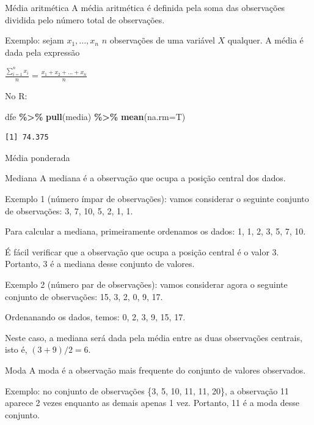 \documentclass[
  9pt,
  ignorenonframetext,
  aspectratio=169]{beamer}
\newenvironment{Shaded}{\begin{snugshade}}{\end{snugshade}}
\newcommand{\DataTypeTok}[1]{\textcolor[rgb]{0.13,0.29,0.53}{#1}}
\newcommand{\KeywordTok}[1]{\textcolor[rgb]{0.13,0.29,0.53}{\textbf{#1}}}
\newcommand{\NormalTok}[1]{#1}
\newcommand{\OperatorTok}[1]{\textcolor[rgb]{0.81,0.36,0.00}{\textbf{#1}}}
\newcommand{\StringTok}[1]{\textcolor[rgb]{0.31,0.60,0.02}{#1}}
\begin{document}
\begin{frame}[fragile]{Média aritmética}
\protect\hypertarget{muxe9dia-aritmuxe9tica}{}
A média aritmética é definida pela soma das observações dividida pelo
número total de observações.

Exemplo: sejam \(x_1, ..., x_n\) \(n\) observações de uma variável \(X\)
qualquer. A média é dada pela expressão

\(\frac{\sum_{i=1}^{n}x_i}{n} = \frac{x_1 + x_2 + ... + x_n}{n}\)

No R:

\begin{Shaded}
\begin{Highlighting}[]
\NormalTok{dfe }\OperatorTok{\%\textgreater{}\%}
\StringTok{  }\KeywordTok{pull}\NormalTok{(media) }\OperatorTok{\%\textgreater{}\%}
\StringTok{  }\KeywordTok{mean}\NormalTok{(}\DataTypeTok{na.rm=}\NormalTok{T)}
\end{Highlighting}
\end{Shaded}

\begin{verbatim}
[1] 74.375
\end{verbatim}
\end{frame}

\begin{frame}{Média ponderada}
\protect\hypertarget{muxe9dia-ponderada}{}
\end{frame}

\begin{frame}{Mediana}
\protect\hypertarget{mediana}{}
A mediana é a observação que ocupa a posição central dos dados.

Exemplo 1 (número ímpar de observações): vamos considerar o seguinte
conjunto de observações: 3, 7, 10, 5, 2, 1, 1.

Para calcular a mediana, primeiramente ordenamos os dados: 1, 1, 2, 3,
5, 7, 10.

É fácil verificar que a observação que ocupa a posição central é o valor
3. Portanto, 3 é a mediana desse conjunto de valores.

Exemplo 2 (número par de observações): vamos considerar agora o seguinte
conjunto de observações: 15, 3, 2, 0, 9, 17.

Ordenanando os dados, temos: 0, 2, 3, 9, 15, 17.

Neste caso, a mediana será dada pela média entre as duas observações
centrais, isto é, \((3 + 9)/2 = 6\).
\end{frame}

\begin{frame}{Moda}
\protect\hypertarget{moda}{}
A moda é a observação mais frequente do conjunto de valores observados.

Exemplo: no conjunto de observações \{3, 5, 10, 11, 11, 20\}, a
observação 11 aparece 2 vezes enquanto as demais apenas 1 vez. Portanto,
11 é a moda desse conjunto.
\end{frame}
\end{document}
